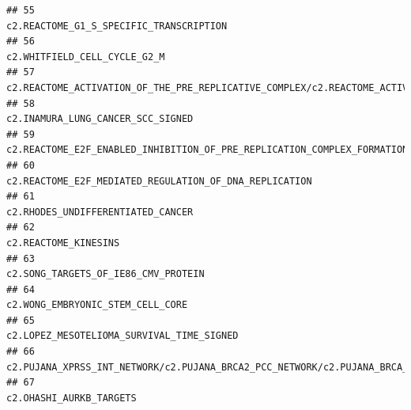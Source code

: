 \documentclass{article}\usepackage[]{graphicx}\usepackage[]{color}
\makeatletter
\newenvironment{kframe}{%
 \def\at@end@of@kframe{}%
 \ifinner\ifhmode%
  \def\at@end@of@kframe{\end{minipage}}%
  \begin{minipage}{\columnwidth}%
 \fi\fi%
 \def\FrameCommand##1{\hskip\@totalleftmargin \hskip-\fboxsep
 \colorbox{shadecolor}{##1}\hskip-\fboxsep
     \hskip-\linewidth \hskip-\@totalleftmargin \hskip\columnwidth}%
 \MakeFramed {\advance\hsize-\width
   \@totalleftmargin\z@ \linewidth\hsize
   \@setminipage}}%
 {\par\unskip\endMakeFramed%
 \at@end@of@kframe}
\newenvironment{knitrout}{}{} %
\makeatother
\begin{document}
\begin{knitrout}
\begin{kframe}
\begin{verbatim}
## 55                                                                                                                                                                           c2.REACTOME_G1_S_SPECIFIC_TRANSCRIPTION
## 56                                                                                                                                                                                      c2.WHITFIELD_CELL_CYCLE_G2_M
## 57                                                                c2.REACTOME_ACTIVATION_OF_THE_PRE_REPLICATIVE_COMPLEX/c2.REACTOME_ACTIVATION_OF_ATR_IN_RESPONSE_TO_REPLICATION_STRESS/c2.REACTOME_G2_M_CHECKPOINTS
## 58                                                                                                                                                                                 c2.INAMURA_LUNG_CANCER_SCC_SIGNED
## 59                                                                                                                                           c2.REACTOME_E2F_ENABLED_INHIBITION_OF_PRE_REPLICATION_COMPLEX_FORMATION
## 60                                                                                                                                                            c2.REACTOME_E2F_MEDIATED_REGULATION_OF_DNA_REPLICATION
## 61                                                                                                                                                                                 c2.RHODES_UNDIFFERENTIATED_CANCER
## 62                                                                                                                                                                                              c2.REACTOME_KINESINS
## 63                                                                                                                                                                               c2.SONG_TARGETS_OF_IE86_CMV_PROTEIN
## 64                                                                                                                                                                                  c2.WONG_EMBRYONIC_STEM_CELL_CORE
## 65                                                                                                                                                                         c2.LOPEZ_MESOTELIOMA_SURVIVAL_TIME_SIGNED
## 66                                                                                                                           c2.PUJANA_XPRSS_INT_NETWORK/c2.PUJANA_BRCA2_PCC_NETWORK/c2.PUJANA_BRCA_CENTERED_NETWORK
## 67                                                                                                                                                                                           c2.OHASHI_AURKB_TARGETS

\end{verbatim}
\end{kframe}
\end{knitrout}
\end{document}
